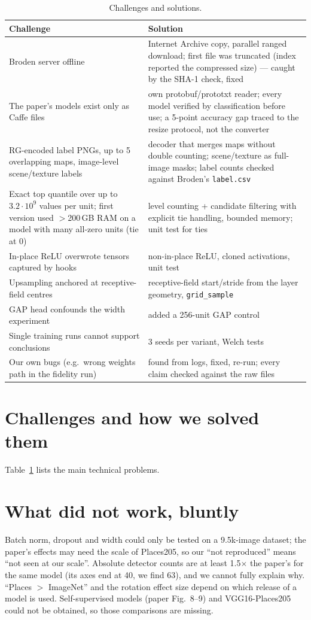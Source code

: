 \documentclass[10pt,a4paper]{article}
\begin{document}
\begin{table}[t]\centering\small
\begin{tabularx}{\linewidth}{@{}>{\raggedright\arraybackslash}p{4.6cm}X@{}}\toprule
Challenge & Solution \\\midrule
Broden server offline & Internet Archive copy, parallel ranged download; first file was truncated (index reported the compressed size) --- caught by the SHA-1 check, fixed \\
The paper's models exist only as Caffe files & own protobuf/prototxt reader; every model verified by classification before use; a 5-point accuracy gap traced to the resize protocol, not the converter \\
RG-encoded label PNGs, up to 5 overlapping maps, image-level scene/texture labels & decoder that merges maps without double counting; scene/texture as full-image masks; label counts checked against Broden's \texttt{label.csv} \\
Exact top quantile over up to $3.2\cdot10^9$ values per unit; first version used $>$200\,GB RAM on a model with many all-zero units (tie at 0) & level counting + candidate filtering with explicit tie handling, bounded memory; unit test for ties \\
In-place ReLU overwrote tensors captured by hooks & non-in-place ReLU, cloned activations, unit test \\
Upsampling anchored at receptive-field centres & receptive-field start/stride from the layer geometry, \texttt{grid\_sample} \\
GAP head confounds the width experiment & added a 256-unit GAP control \\
Single training runs cannot support conclusions & 3 seeds per variant, Welch tests \\
Our own bugs (e.g.\ wrong weights path in the fidelity run) & found from logs, fixed, re-run; every claim checked against the raw files \\\bottomrule
\end{tabularx}
\caption{Challenges and solutions.}\label{tab:chal}
\end{table}

\FloatBarrier
\section{Challenges and how we solved them}
Table~\ref{tab:chal} lists the main technical problems.

\section{What did not work, bluntly}
Batch norm, dropout and width could only be tested on a 9.5k-image dataset; the paper's effects may need the scale of
Places205, so our ``not reproduced'' means ``not seen at our scale''. Absolute detector counts are at least 1.5$\times$ the
paper's for the same model (its axes end at 40, we find 63), and we cannot fully explain why. ``Places $>$ ImageNet'' and the
rotation effect size depend on which release of a model is used. Self-supervised models (paper Fig.~8--9) and
VGG16-Places205 could not be obtained, so those comparisons are missing.
\end{document}
